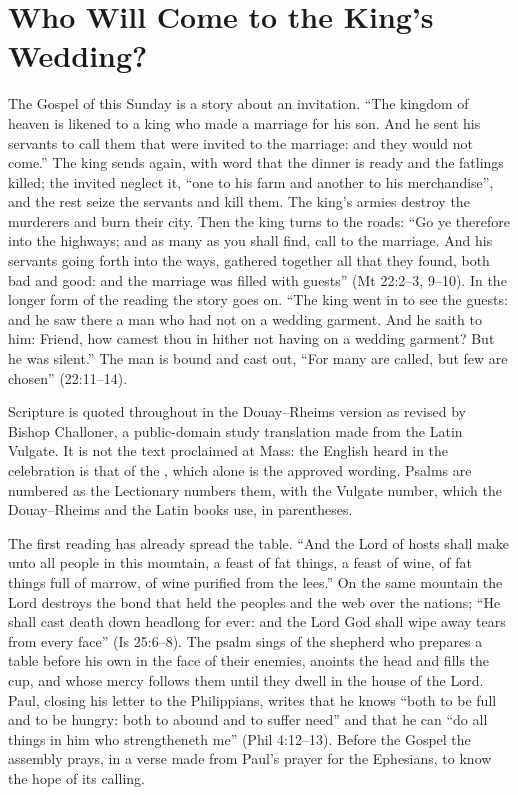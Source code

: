 \section{Who Will Come to the King's Wedding?}
\label{sec:opening}

The Gospel of this Sunday is a story about an invitation. ``The kingdom of
heaven is likened to a king who made a marriage for his son. And he sent his
servants to call them that were invited to the marriage: and they would not
come.'' The king sends again, with word that the dinner is ready and the
fatlings killed; the invited neglect it, ``one to his farm and another to his
merchandise'', and the rest seize the servants and kill them. The king's
armies destroy the murderers and burn their city. Then the king turns to the
roads: ``Go ye therefore into the highways; and as many as you shall find,
call to the marriage. And his servants going forth into the ways, gathered
together all that they found, both bad and good: and the marriage was filled
with guests'' (Mt 22:2--3, 9--10). In the longer form of the reading the story
goes on. ``The king went in to see the guests: and he saw there a man who had
not on a wedding garment. And he saith to him: Friend, how camest thou in
hither not having on a wedding garment? But he was silent.'' The man is bound
and cast out, ``For many are called, but few are chosen'' (22:11--14).

{\small\noindent Scripture is quoted throughout in the Douay--Rheims version as
revised by Bishop Challoner, a public-domain study translation made from the
Latin Vulgate. It is not the text proclaimed at Mass: the English heard in the
celebration is that of the , which alone is the approved wording. Psalms are
numbered as the Lectionary numbers them, with the Vulgate number, which the
Douay--Rheims and the Latin books use, in parentheses.\par}
\medskip

The first reading has already spread the table. ``And the Lord of hosts shall
make unto all people in this mountain, a feast of fat things, a feast of wine,
of fat things full of marrow, of wine purified from the lees.'' On the same
mountain the Lord destroys the bond that held the peoples and the web over the
nations; ``He shall cast death down headlong for ever: and the Lord God shall
wipe away tears from every face'' (Is 25:6--8). The psalm sings of the
shepherd who prepares a table before his own in the face of their enemies,
anoints the head and fills the cup, and whose mercy follows them until they
dwell in the house of the Lord. Paul, closing his letter to the Philippians,
writes that he knows ``both to be full and to be hungry: both to abound and to
suffer need'' and that he can ``do all things in him who strengtheneth me''
(Phil 4:12--13). Before the Gospel the assembly prays, in a verse made from
Paul's prayer for the Ephesians, to know the hope of its calling.

